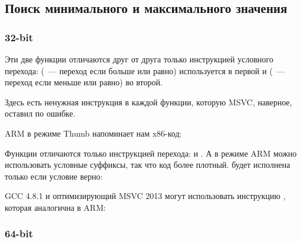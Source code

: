 ﻿\subsection{Поиск минимального и максимального значения}

\subsubsection{32-bit}





Эти две функции отличаются друг от друга только инструкцией условного перехода:
 (~--- переход если больше или равно) используется в первой
и  (~--- переход если меньше или равно) во второй.

\myindex{\CompilerAnomaly}
\label{MSVC_double_JMP_anomaly}
Здесь есть ненужная инструкция \JMP в каждой функции, которую MSVC, наверное, оставил по ошибке.


ARM в режиме Thumb напоминает нам x86-код:



Функции отличаются только инструкцией перехода:  и .
А в режиме ARM можно использовать условные суффиксы, так что код более плотный.
 будет исполнена только если условие верно:




\Optimizing GCC 4.8.1 и оптимизирующий MSVC 2013 
могут использовать инструкцию , которая аналогична  в ARM:



\subsubsection{64-bit}


